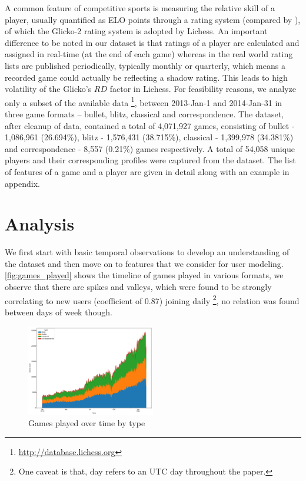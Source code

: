 \documentclass[sigconf]{acmart}
\begin{document}
A common feature of competitive sports is measuring the relative skill of a player, usually quantified as ELO points through a rating system (compared by \cite{vevcek2014comparison}), of which the Glicko-2 \cite{glickman1995glicko} rating system is adopted by Lichess. An important difference to be noted in our dataset is that ratings of a player 
are calculated and assigned in real-time (at the end of each game) whereas in the real world rating lists are
published periodically, typically monthly or quarterly, which means a recorded game could actually be reflecting a
shadow rating. This leads to high volatility of the Glicko's $RD$ factor in Lichess. For feasibility reasons, we
analyze only a subset of the available data \footnote{\url{http://database.lichess.org}}, between 2013-Jan-1 and 2014-Jan-31 in three game formats -- bullet, blitz, classical and correspondence. The dataset, after cleanup of data, contained a total of 4,071,927 games, consisting of bullet - 1,086,961 (26.694\%), blitz - 1,576,431 (38.715\%), classical - 1,399,978 (34.381\%) and correspondence - 8,557 (0.21\%) games respectively. A total of 54,058 unique players and their corresponding profiles were captured from the dataset. The list of features of a game and a player are given in detail along with an example in appendix.

\section{Analysis}

We first start with basic temporal observations to develop an understanding of the dataset and then move on to features that we consider for user modeling. \autoref{fig:games_played} shows the timeline of games played in various formats, we observe that there are spikes and valleys, which were found to be strongly correlating to new users (coefficient of 0.87) joining daily \footnote{One caveat is that, day refers to an UTC day throughout the paper.}, no relation was found between days of week though.

\begin{figure}[htbp]
\caption{Games played over time by type}
\label{fig:games_played}
\includegraphics[width=0.5\textwidth]{games_played}
\end{figure}
\end{document}
